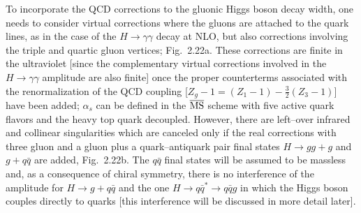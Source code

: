 To incorporate the QCD corrections to the gluonic Higgs boson decay width, one
needs to consider virtual corrections where the gluons are attached to the
quark lines, as in the case of the $H \to \gamma \gamma$ decay at NLO, but also
corrections involving the triple and  quartic gluon vertices; Fig.~2.22a. These
corrections are finite in the ultraviolet [since the complementary virtual
corrections involved in the $H \to \gamma \gamma$ amplitude are also finite]
once the proper counterterms associated with the renormalization of the QCD
coupling [$Z_g-1= (Z_1- 1) -\frac{3}{2}(Z_3-1)]$ have been added;  $\alpha_s$
can be defined in the $\overline{\rm MS}$ scheme with five active quark flavors
and the heavy top quark decoupled. However, there are left--over infrared and
collinear singularities which are canceled only if the real corrections with
three gluon and a gluon plus a quark--antiquark pair final states $H \to gg+ g$
and $g+ q\bar{q}$ are added, Fig.~2.22b. The $q\bar{q}$ final states will be
assumed to be massless and, as a consequence of chiral symmetry, there is no
interference of the amplitude for $H \to g+ q\bar{q}$ and the one $H \to
q\bar{q}^* \to q\bar{q} g$ in which the Higgs boson couples directly to quarks
[this interference will be discussed in more detail later].



